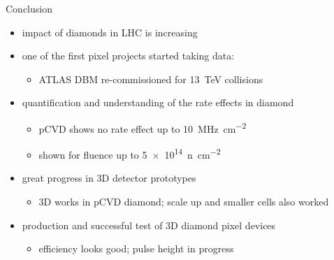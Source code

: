 \begin{frame}{Conclusion}
	\begin{itemize}
		\itemfill
		\item impact of diamonds in LHC is increasing
		\item one of the first pixel projects started taking data:
		\begin{itemize}
			\item ATLAS DBM re-commissioned for \SI{13}{\tera\electronvolt} collisions
		\end{itemize}
		\item quantification and understanding of the rate effects in diamond
		\begin{itemize}
			\item pCVD shows no rate effect up to \SI{10}{\mega\hertz\per cm^2} 
			\item shown for fluence up to \SI{5e14}{n\per cm^2}
		\end{itemize}
		\item great progress in 3D detector prototypes
		\begin{itemize}
			\item 3D works in pCVD diamond; scale up and smaller cells also worked
		\end{itemize}
		\item production and successful test of 3D diamond pixel devices
		\begin{itemize}
			\item efficiency looks good; pulse height in progress
		\end{itemize}
	\end{itemize}
\end{frame}
